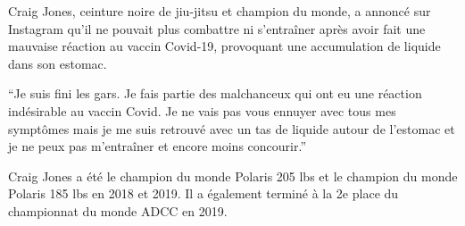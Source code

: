 Craig Jones, ceinture noire de jiu-jitsu et champion du monde, a annoncé sur
Instagram qu'il ne pouvait plus combattre ni s'entraîner après avoir fait une
mauvaise réaction au vaccin Covid-19, provoquant une accumulation de liquide
dans son estomac.

``Je suis fini les gars. Je fais partie des malchanceux qui ont eu une réaction
indésirable au vaccin Covid. Je ne vais pas vous ennuyer avec tous mes symptômes
mais je me suis retrouvé avec un tas de liquide autour de l'estomac et je ne
peux pas m'entraîner et encore moins concourir.''

Craig Jones a été le champion du monde Polaris 205 lbs et le champion du monde
Polaris 185 lbs en 2018 et 2019. Il a également terminé à la 2e place du
championnat du monde ADCC en 2019.
